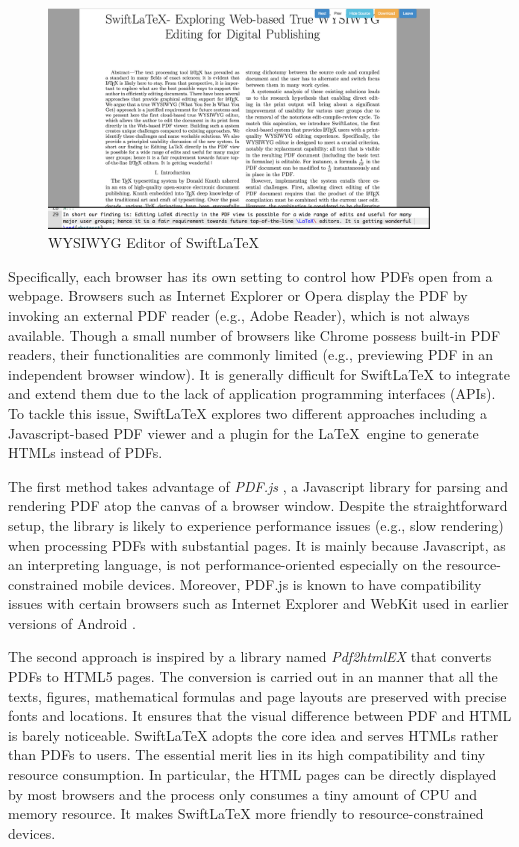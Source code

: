 \documentclass[sigconf]{acmart}
\begin{document}
\begin{figure}[t]

\begin{center}
\includegraphics[width=0.90\textwidth]{figure/screenshot}
\caption{WYSIWYG Editor of SwiftLaTeX}
\label{fig:screenshot}
\end{center}
\vspace{-0.1in}
\end{figure} 

Specifically, each browser has its own setting to control how PDFs open from a webpage. 
Browsers such as Internet Explorer or Opera display the PDF by invoking an external PDF reader (e.g., Adobe Reader), which is not always available.
Though a small number of browsers like Chrome possess built-in PDF readers, their functionalities are commonly limited (e.g., previewing PDF in an independent browser window). 
It is generally difficult for SwiftLaTeX to integrate and extend them due to the lack of application programming interfaces (APIs).
To tackle this issue, SwiftLaTeX explores two different approaches including a Javascript-based PDF viewer and a plugin for the \LaTeX\ engine to generate HTMLs instead of PDFs.

The first method takes advantage of \textit{PDF.js} \cite{pdfjsintro}, a Javascript library for parsing and rendering PDF atop the canvas of a browser window. Despite the straightforward setup, the library is likely to experience performance issues (e.g., slow rendering) when processing PDFs with substantial pages. It is mainly because Javascript, as an interpreting language, is not performance-oriented especially on the resource-constrained mobile devices. Moreover, PDF.js is known to have compatibility issues with certain browsers such as Internet Explorer and WebKit used in earlier versions of Android \cite{pdfjs}.

The second approach is inspired by a library named \textit{Pdf2htmlEX} \cite{wang2013online} that converts PDFs to HTML5 pages.  
The conversion is carried out in an manner that all the texts, figures, mathematical formulas and page layouts are preserved with precise fonts and locations. It ensures that the visual difference between PDF and HTML is barely noticeable.
SwiftLaTeX adopts the core idea and serves HTMLs rather than PDFs to users. The essential merit lies in its high compatibility and tiny resource consumption.
 In particular, the HTML pages can be directly displayed by most browsers and the process only consumes a tiny amount of CPU and memory resource. It makes SwiftLaTeX more friendly to resource-constrained devices.
\end{document}
